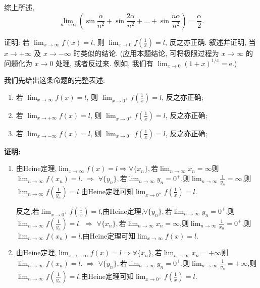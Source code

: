 \begin{solution}
    综上所述,$$\lim_{n \to \infty} \left(\sin\frac{\alpha}{n^2} + \sin\frac{2\alpha}{n^2} + \dots + \sin\frac{n\alpha}{n^2}\right) = \frac{\alpha}{2}.$$

\end{solution}

\begin{exercise}[1.3.8]
    证明: 若 $\lim_{x \to \infty} f(x) = l$, 则 $\lim_{x \to 0} f\left(\frac{1}{x}\right)=l$, 反之亦正确. 叙述并证明, 当 $x \to +\infty$ 及 $x \to -\infty$ 时类似的结论. (应用本题结论, 可将极限过程为 $x \to \infty$ 的问题化为 $x \to 0$ 处理, 或者反过来. 例如, 我们有 $\lim_{x \to 0} (1+x)^{1/x} = \mathrm{e}$.)
\end{exercise}

\begin{solution}
    我们先给出这条命题的完整表述:
    \begin{proposition*}
        \begin{enumerate}[(1)]
            \item 若 $\lim_{x \to \infty} f(x) = l$, 则 $\lim_{x \to 0^+} f\left(\frac{1}{x}\right)=l$, 反之亦正确;
            \item 若 $\lim_{x \to +\infty} f(x) = l$, 则 $\lim_{x \to 0^+} f\left(\frac{1}{x}\right)=l$, 反之亦正确;
            \item 若 $\lim_{x \to -\infty} f(x) = l$, 则 $\lim_{x \to 0^-} f\left(\frac{1}{x}\right)=l$, 反之亦正确;
        \end{enumerate}
    \end{proposition*}
    \noindent
    \textbf{证明:}
    \begin{enumerate}[(1)]
        \item 由Heine定理,$\lim_{x \to \infty} f(x) = l \Rightarrow \forall \{x_n\},$若$\lim_{n \to \infty} x_n = \infty$则$\lim_{n \to \infty} f(x_n) = l$. $\Rightarrow$ $\forall \{ y_n \},$若$\lim_{n \to \infty} y_n = 0^+$,则$\lim_{n \to \infty} \frac{1}{y_n} = \infty$,则$\lim_{n \to \infty} f\left( \frac{1}{y_n} \right) = l$.由Heine定理可知$\lim_{x \to 0^+} f\left(\frac{1}{x}\right)=l$.

              反之,若$\lim_{x \to 0^+} f\left(\frac{1}{x}\right)=l$,由Heine定理,$\forall \{y_n\},$若$\lim_{n \to \infty} y_n = 0^+$,则$\lim_{n \to \infty} f\left( \frac{1}{y_n} \right) = l$. $\Rightarrow$ $\forall \{x_n\},$若$\lim_{n \to \infty} x_n = \infty$,则$\lim_{n \to \infty} \frac{1}{x_n} = 0^+$,则$\lim_{n \to \infty} f(x_n) = l$.由Heine定理可知$\lim_{x \to \infty} f(x) = l$.
        \item 由Heine定理,$\lim_{x \to +\infty} f(x) = l \Rightarrow \forall \{x_n\},$若$\lim_{n \to \infty} x_n = +\infty$则$\lim_{n \to \infty} f(x_n) = l$. $\Rightarrow$ $\forall \{ y_n \},$若$\lim_{n \to \infty} y_n = 0^+$,则$\lim_{n \to \infty} \frac{1}{y_n} = +\infty$,则$\lim_{n \to \infty} f\left( \frac{1}{y_n} \right) = l$.由Heine定理可知$\lim_{x \to 0^+} f\left(\frac{1}{x}\right)=l$.


\end{enumerate}
\end{solution}
